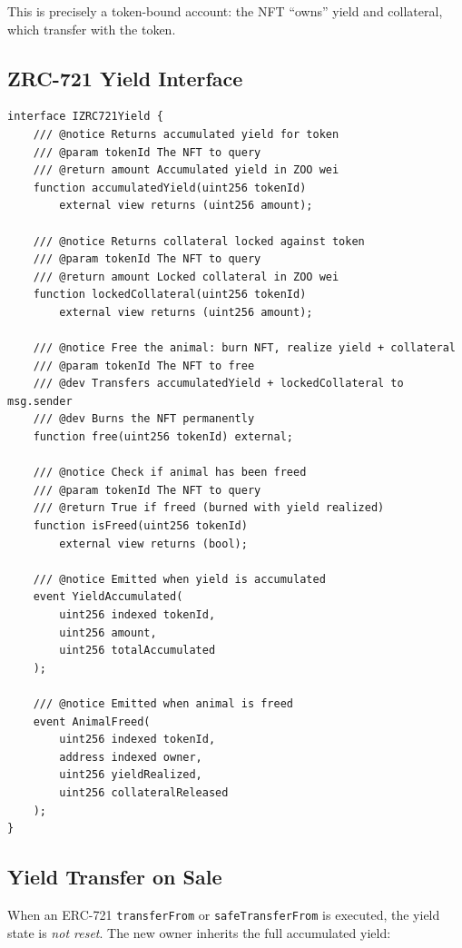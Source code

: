 \documentclass[11pt,letterpaper]{article}
\begin{document}
This is precisely a token-bound account: the NFT ``owns'' yield and collateral, which transfer with the token.

\subsection{ZRC-721 Yield Interface}

\begin{lstlisting}[language=Solidity,caption=ZRC-721 Yield Interface]
interface IZRC721Yield {
    /// @notice Returns accumulated yield for token
    /// @param tokenId The NFT to query
    /// @return amount Accumulated yield in ZOO wei
    function accumulatedYield(uint256 tokenId)
        external view returns (uint256 amount);

    /// @notice Returns collateral locked against token
    /// @param tokenId The NFT to query
    /// @return amount Locked collateral in ZOO wei
    function lockedCollateral(uint256 tokenId)
        external view returns (uint256 amount);

    /// @notice Free the animal: burn NFT, realize yield + collateral
    /// @param tokenId The NFT to free
    /// @dev Transfers accumulatedYield + lockedCollateral to msg.sender
    /// @dev Burns the NFT permanently
    function free(uint256 tokenId) external;

    /// @notice Check if animal has been freed
    /// @param tokenId The NFT to query
    /// @return True if freed (burned with yield realized)
    function isFreed(uint256 tokenId)
        external view returns (bool);

    /// @notice Emitted when yield is accumulated
    event YieldAccumulated(
        uint256 indexed tokenId,
        uint256 amount,
        uint256 totalAccumulated
    );

    /// @notice Emitted when animal is freed
    event AnimalFreed(
        uint256 indexed tokenId,
        address indexed owner,
        uint256 yieldRealized,
        uint256 collateralReleased
    );
}
\end{lstlisting}

\subsection{Yield Transfer on Sale}

When an ERC-721 \texttt{transferFrom} or \texttt{safeTransferFrom} is executed, the yield state is \emph{not reset}. The new owner inherits the full accumulated yield:
\end{document}
